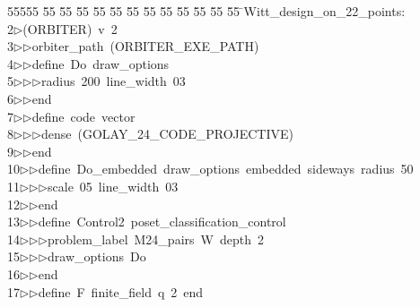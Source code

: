 %
%
\begin{tabbing}
55555 \= 55 \= 55 \= 55 \= 55 \= 55 \= 55 \= 55 \= 55 \= 55 \= 55 \= 55 \= 55 \= \>Witt\_design\_on\_22\_points:\\[0pt]
2\>$\triangleright$\>(ORBITER)\ v\ 2\ \\[0pt]
3\>$\triangleright$\>$\triangleright$\>orbiter\_path\ (ORBITER\_EXE\_PATH)\ \\[0pt]
4\>$\triangleright$\>$\triangleright$\>define\ Do\ draw\_options\ \\[0pt]
5\>$\triangleright$\>$\triangleright$\>$\triangleright$\>radius\ 200\ line\_width\ 03\ \\[0pt]
6\>$\triangleright$\>$\triangleright$\>end\ \\[0pt]
7\>$\triangleright$\>$\triangleright$\>define\ code\ vector\ \\[0pt]
8\>$\triangleright$\>$\triangleright$\>$\triangleright$\>dense\ (GOLAY\_24\_CODE\_PROJECTIVE)\ \\[0pt]
9\>$\triangleright$\>$\triangleright$\>end\ \\[0pt]
10\>$\triangleright$\>$\triangleright$\>define\ Do\_embedded\ draw\_options\ embedded\ sideways\ radius\ 50\ \\[0pt]
11\>$\triangleright$\>$\triangleright$\>$\triangleright$\>scale\ 05\ line\_width\ 03\ \\[0pt]
12\>$\triangleright$\>$\triangleright$\>end\ \\[0pt]
13\>$\triangleright$\>$\triangleright$\>define\ Control2\ poset\_classification\_control\ \\[0pt]
14\>$\triangleright$\>$\triangleright$\>$\triangleright$\>problem\_label\ M24\_pairs\ W\ depth\ 2\ \\[0pt]
15\>$\triangleright$\>$\triangleright$\>$\triangleright$\>draw\_options\ Do\ \\[0pt]
16\>$\triangleright$\>$\triangleright$\>end\ \\[0pt]
17\>$\triangleright$\>$\triangleright$\>define\ F\ finite\_field\ q\ 2\ end\ \\[0pt]

\end{tabbing}
